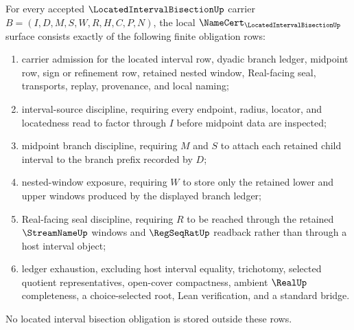 \begin{theorem}
\label{thm:located-interval-bisection-namecert-obligations}
For every accepted $\LocatedIntervalBisectionUp$ carrier $B=(I,D,M,S,W,R,H,C,P,N)$, the local $\NameCert_{\LocatedIntervalBisectionUp}$ surface consists exactly of the following finite obligation rows:
\begin{enumerate}
\item carrier admission for the located interval row, dyadic branch ledger, midpoint row, sign or refinement row, retained nested window, Real-facing seal, transports, replay, provenance, and local naming;
\item interval-source discipline, requiring every endpoint, radius, locator, and locatedness read to factor through $I$ before midpoint data are inspected;
\item midpoint branch discipline, requiring $M$ and $S$ to attach each retained child interval to the branch prefix recorded by $D$;
\item nested-window exposure, requiring $W$ to store only the retained lower and upper windows produced by the displayed branch ledger;
\item Real-facing seal discipline, requiring $R$ to be reached through the retained $\StreamNameUp$ windows and $\RegSeqRatUp$ readback rather than through a host interval object;
\item ledger exhaustion, excluding host interval equality, trichotomy, selected quotient representatives, open-cover compactness, ambient $\RealUp$ completeness, a choice-selected root, Lean verification, and a standard bridge.
\end{enumerate}
No located interval bisection obligation is stored outside these rows.
\end{theorem}
